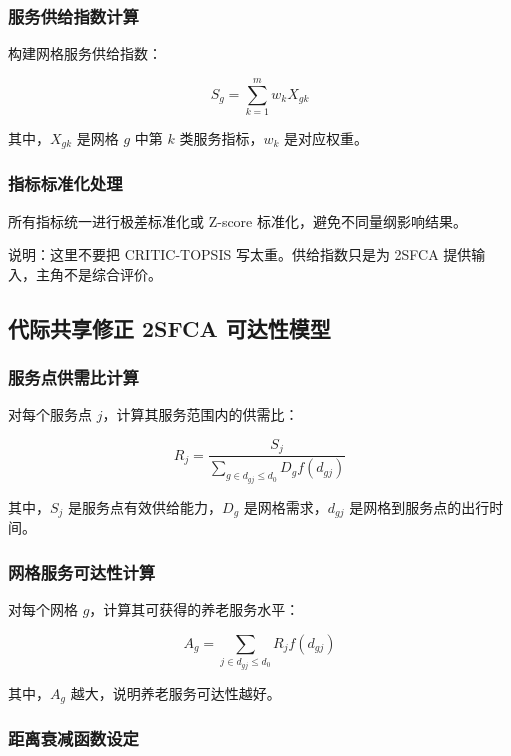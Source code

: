 \documentclass[UTF8,zihao=-4,a4paper,fontset=none]{ctexart}
\begin{document}
\subsubsection{服务供给指数计算}

构建网格服务供给指数：

\begin{equation}
S_g = \sum_{k=1}^{m} w_k X_{gk}
\end{equation}

其中，$X_{gk}$ 是网格 $g$ 中第 $k$ 类服务指标，$w_k$ 是对应权重。

\subsubsection{指标标准化处理}

所有指标统一进行极差标准化或 Z-score 标准化，避免不同量纲影响结果。

说明：这里不要把 CRITIC-TOPSIS 写太重。供给指数只是为 2SFCA 提供输入，主角不是综合评价。

\subsection{代际共享修正 2SFCA 可达性模型}

\subsubsection{服务点供需比计算}

对每个服务点 $j$，计算其服务范围内的供需比：

\begin{equation}
R_j = \frac{S_j}{\sum_{g \in d_{gj} \leq d_0} D_g f(d_{gj})}
\end{equation}

其中，$S_j$ 是服务点有效供给能力，$D_g$ 是网格需求，$d_{gj}$ 是网格到服务点的出行时间。

\subsubsection{网格服务可达性计算}

对每个网格 $g$，计算其可获得的养老服务水平：

\begin{equation}
A_g = \sum_{j \in d_{gj} \leq d_0} R_j f(d_{gj})
\end{equation}

其中，$A_g$ 越大，说明养老服务可达性越好。

\subsubsection{距离衰减函数设定}
\end{document}
